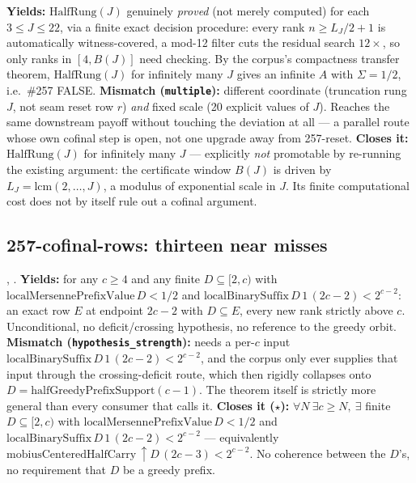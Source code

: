 \begin{obs} 
\textbf{Yields:} $\mathrm{HalfRung}(J)$ genuinely \emph{proved} (not merely computed) for each $3
\le J \le 22$, via a finite exact decision procedure: every rank $n \ge L_J/2+1$ is automatically
witness-covered, a mod-12 filter cuts the residual search $12\times$, so only ranks in
$[4,B(J)]$ need checking. By the corpus's compactness transfer theorem, $\mathrm{HalfRung}(J)$
for infinitely many $J$ gives an infinite $A$ with $\Sigma = 1/2$, i.e.\ \#257 FALSE.
\textbf{Mismatch (\texttt{multiple}):} different coordinate (truncation rung $J$, not seam reset
row $r$) \emph{and} fixed scale (20 explicit values of $J$). Reaches the same downstream payoff
without touching the deviation at all — a parallel route whose own cofinal step is open, not one
upgrade away from 257-reset.
\textbf{Closes it:} $\mathrm{HalfRung}(J)$ for infinitely many $J$ — explicitly \emph{not}
promotable by re-running the existing argument: the certificate window $B(J)$ is driven by $L_J
= \mathrm{lcm}(2,\dots,J)$, a modulus of exponential scale in $J$. Its finite computational
cost does not by itself rule out a cofinal argument.
\end{obs}

\subsection{257-cofinal-rows: thirteen near misses}

\begin{obs} 
,
.
\textbf{Yields:} for any $c \ge 4$ and any finite $D \subseteq [2,c)$ with
$\mathrm{localMersennePrefixValue}\,D < 1/2$ and $\mathrm{localBinarySuffix}\,D\,1\,(2c{-}2) <
2^{c-2}$: an exact row $E$ at endpoint $2c{-}2$ with $D \subseteq E$, every new rank strictly
above $c$. Unconditional, no deficit/crossing hypothesis, no reference to the greedy orbit.
\textbf{Mismatch (\texttt{hypothesis\_strength}):} needs a per-$c$ input
$\mathrm{localBinarySuffix}\,D\,1\,(2c{-}2) < 2^{c-2}$, and the corpus only ever supplies that
input through the crossing-deficit route, which
then rigidly collapses onto $D = \mathrm{halfGreedyPrefixSupport}(c{-}1)$. The theorem itself is
strictly more general than every consumer that calls it.
\textbf{Closes it ($\star$):} $\forall N\ \exists c \ge N,\ \exists$ finite $D \subseteq [2,c)$
with $\mathrm{localMersennePrefixValue}\,D<1/2$ and $\mathrm{localBinarySuffix}\,D\,1\,(2c{-}2) <
2^{c-2}$ — equivalently $\mathrm{mobiusCenteredHalfCarry}\,{\uparrow}D\,(2c{-}3) < 2^{c-2}$. No
coherence between the $D$'s, no requirement that $D$ be a greedy prefix.
\end{obs}

